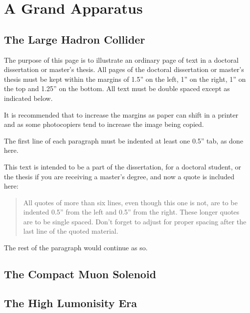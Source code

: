 \chapter{A Grand Apparatus}
\section{The Large Hadron Collider}
The purpose of this page is to illustrate an ordinary page of text in
a doctoral dissertation or master's thesis. All pages of the doctoral
dissertation or master's thesis must be kept within the margins of
1.5'' on the left, 1'' on the right, 1'' on the top and 1.25'' on the
bottom. All text must be double spaced except as indicated below.

It is recommended that to increase the margins as paper can shift in a
printer and as some photocopiers tend to increase the image being
copied.

The first line of each paragraph must be indented at least one 0.5''
tab, as done here.

This text is intended to be a part of the dissertation, for a doctoral
student, or the thesis if you are receiving a master's degree, and now
a quote is included here:
\begin{quote}
All quotes of more than six lines, even though this one is not, are to
be indented 0.5'' from the left and 0.5'' from the right. These longer
quotes are to be single spaced. Don't forget to adjust for proper
spacing after the last line of the quoted material.
\end{quote}
The rest of the paragraph would continue as so.
\section{The Compact Muon Solenoid}
\section{The High Lumonisity Era}

